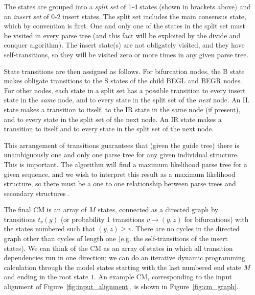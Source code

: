 \documentclass[11pt]{article}
\begin{document}
The states are grouped into a \emph{split set} of 1-4 states (shown in
brackets above) and an \emph{insert set} of 0-2 insert states. The
split set includes the main consensus state, which by convention is
first. One and only one of the states in the split set must be visited
in every parse tree (and this fact will be exploited by the divide and
conquer algorithm). The insert state(s) are not obligately visited,
and they have self-transitions, so they will be visited zero or more
times in any given parse tree.

State transitions are then assigned as follows. For bifurcation nodes,
the B state makes obligate transitions to the S states of the child
BEGL and BEGR nodes. For other nodes, each state in a split set has a
possible transition to every insert state in the \emph{same} node, and
to every state in the split set of the \emph{next} node. An IL state
makes a transition to itself, to the IR state in the same node (if
present), and to every state in the split set of the next node. An IR
state makes a transition to itself and to every state in the split set
of the next node.

This arrangement of transitions guarantees that (given the guide tree)
there is unambiguously one and only one parse tree for any given
individual structure. This is important. The algorithm will find a
maximum likelihood parse tree for a given sequence, and we wish to
interpret this result as a maximum likelihood structure, so there must
be a one to one relationship between parse trees and secondary
structures \cite{Giegerich00}.

The final CM is an array of $M$ states, connected as a directed graph
by transitions $t_v(y)$ (or probability 1 transitions $v \rightarrow
(y,z)$ for bifurcations) with the states numbered such that $(y,z)
\geq v$. There are no cycles in the directed graph other than cycles
of length one (e.g. the self-transitions of the insert states). We can
think of the CM as an array of states in which all transition
dependencies run in one direction; we can do an iterative dynamic
programming calculation through the model states starting with the
last numbered end state $M$ and ending in the root state $1$.  An
example CM, corresponding to the input alignment of
Figure~\ref{fig:input_alignment}, is shown in
Figure~\ref{fig:cm_graph}.
\end{document}
